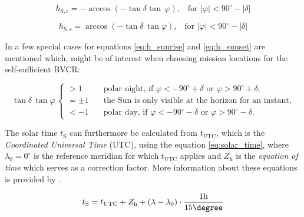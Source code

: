 \begin{center}
	\begin{equation} \label{eq:h_sunrise}
		h_\mathrm{S,r} = - \arccos \left( -\tan \delta \tan \, \varphi \right) \text{,} \quad \text{for } \left|\varphi\right| < 90^\circ - \left|\delta\right|
	\end{equation}
\end{center}

\begin{center}
	\begin{equation} \label{eq:h_sunset}
		h_\mathrm{S,s} = \arccos \left( -\tan \delta \, \tan \varphi \right) \text{,} \quad \text{for } \left|\varphi\right| < 90^\circ - \left|\delta\right|
	\end{equation}
\end{center}

In \cite{Appelbaum:1993} a few special cases for equations \ref{eq:h_sunrise} and \ref{eq:h_sunset} are mentioned which, might be of interest when choosing mission locations for the self-sufficient BVCR:

\[ \tan \delta \, \tan \varphi \,
  \begin{cases}
    > 1       	& \quad \text{polar night, if } \varphi < -90^\circ + \delta \text{ or } \varphi > 90^\circ + \delta \text{,} \\
    = \pm 1  		& \quad \text{the Sun is only visible at the horizon for an instant,} \\
    < -1		& \quad \text{polar day, if } \varphi < -90^\circ - \delta \text{ or } \varphi > 90^\circ - \delta \text{.}
  \end{cases}
\]

The solar time $t_\mathrm{S}$ can furthermore be calculated from $t_\mathrm{UTC}$, which is the \emph{Coordinated Universal Time} (UTC), using the equation \ref{eq:solar_time}, where $\lambda_0 = 0^\circ$ is the reference meridian for which $t_\mathrm{UTC}$ applies and $Z_{\mathrm{h}}$ is the \emph{equation of time} which serves as a correction factor. More information about these equations is provided by \cite{Karttunen:2006, Wagner:2018}.

\begin{center}
	\begin{equation} \label{eq:solar_time}
		t_\mathrm{S} = t_\mathrm{UTC} + Z_{\mathrm{h}} + \left(\lambda - \lambda_{\mathrm{0}}\right) \cdot \frac{1\mathrm{h}}{15\degree}
	\end{equation}
\end{center}

